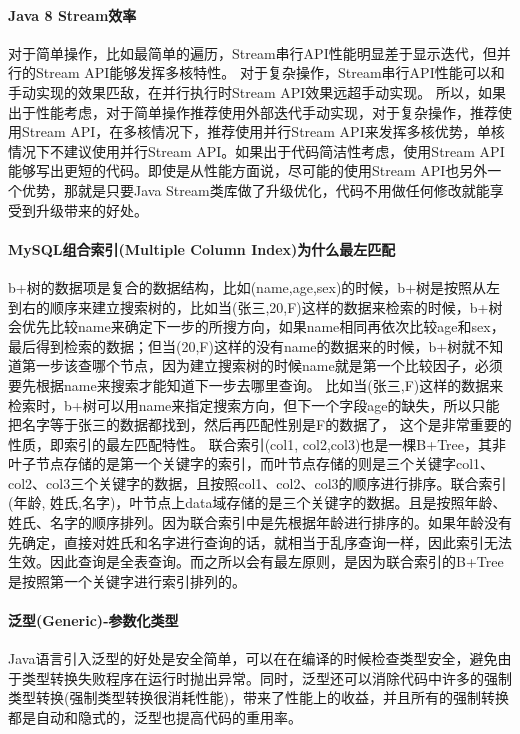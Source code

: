 \documentclass[../../../interview-questions.tex]{subfiles}
\begin{document}
\paragraph{Java 8 Stream效率}

对于简单操作，比如最简单的遍历，Stream串行API性能明显差于显示迭代，但并行的Stream API能够发挥多核特性。
对于复杂操作，Stream串行API性能可以和手动实现的效果匹敌，在并行执行时Stream API效果远超手动实现。
所以，如果出于性能考虑，对于简单操作推荐使用外部迭代手动实现，对于复杂操作，推荐使用Stream API，在多核情况下，推荐使用并行Stream API来发挥多核优势，单核情况下不建议使用并行Stream API。如果出于代码简洁性考虑，使用Stream API能够写出更短的代码。即使是从性能方面说，尽可能的使用Stream API也另外一个优势，那就是只要Java Stream类库做了升级优化，代码不用做任何修改就能享受到升级带来的好处。

\paragraph{MySQL组合索引(Multiple Column Index)为什么最左匹配}

b+树的数据项是复合的数据结构，比如(name,age,sex)的时候，b+树是按照从左到右的顺序来建立搜索树的，比如当(张三,20,F)这样的数据来检索的时候，b+树会优先比较name来确定下一步的所搜方向，如果name相同再依次比较age和sex，最后得到检索的数据；但当(20,F)这样的没有name的数据来的时候，b+树就不知道第一步该查哪个节点，因为建立搜索树的时候name就是第一个比较因子，必须要先根据name来搜索才能知道下一步去哪里查询。
比如当(张三,F)这样的数据来检索时，b+树可以用name来指定搜索方向，但下一个字段age的缺失，所以只能把名字等于张三的数据都找到，然后再匹配性别是F的数据了， 这个是非常重要的性质，即索引的最左匹配特性。
联合索引(col1, col2,col3)也是一棵B+Tree，其非叶子节点存储的是第一个关键字的索引，而叶节点存储的则是三个关键字col1、col2、col3三个关键字的数据，且按照col1、col2、col3的顺序进行排序。联合索引(年龄, 姓氏,名字)，叶节点上data域存储的是三个关键字的数据。且是按照年龄、姓氏、名字的顺序排列。因为联合索引中是先根据年龄进行排序的。如果年龄没有先确定，直接对姓氏和名字进行查询的话，就相当于乱序查询一样，因此索引无法生效。因此查询是全表查询。而之所以会有最左原则，是因为联合索引的B+Tree是按照第一个关键字进行索引排列的。


\paragraph{泛型(Generic)-参数化类型}

Java语言引入泛型的好处是安全简单，可以在在编译的时候检查类型安全，避免由于类型转换失败程序在运行时抛出异常。同时，泛型还可以消除代码中许多的强制类型转换(强制类型转换很消耗性能)，带来了性能上的收益，并且所有的强制转换都是自动和隐式的，泛型也提高代码的重用率。
\end{document}
